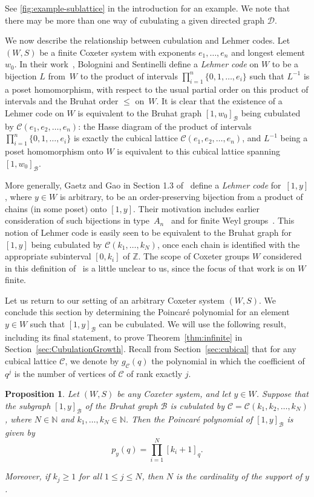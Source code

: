 \documentclass[11pt]{amsart}
\theoremstyle{plain}
\newtheorem{prop}[thm]{Proposition}
\theoremstyle{definition}
\newcommand{\cC}{\mathcal{C}}
\newcommand{\cD}{\mathcal{D}}
\newcommand{\Z}{\mathbb{Z}}
\newcommand{\N}{\mathbb{N}}
\newcommand{\cB}{\mathcal B}
\numberwithin{equation}{subsection}
\begin{document}
See \cref{fig:example-sublattice} in the introduction for an example. We note that there may be more than one way of cubulating a given directed graph $\cD$. 

We now describe the relationship between cubulation and Lehmer codes. Let $(W,S)$ be a finite Coxeter system with exponents $e_1, \dots, e_n$ and longest element $w_0$.  
In their work~\cite{Bolognini2025}, Bolognini and Sentinelli define a \emph{Lehmer code} on $W$ to be a bijection $L$ from~$W$ to the product of intervals $\prod_{i=1}^n \{ 0, 1, \dots, e_i \}$ such that $L^{-1}$ is a poset homomorphism, with respect to the usual partial order on this product of intervals and the Bruhat order $\leq$ on~$W$.
It is clear that the existence of a Lehmer code on $W$ is equivalent to the Bruhat graph $[1,w_0]_\cB$ being cubulated by $\cC(e_1,e_2,\ldots,e_n)$: the Hasse diagram of the product of intervals $\prod_{i=1}^n \{ 0, 1, \dots, e_i \}$ is exactly the cubical lattice $\cC(e_1,e_2,\ldots,e_n)$, and $L^{-1}$ being a poset homomorphism onto $W$  is equivalent to this cubical lattice spanning $[1,w_0]_\cB$. 

More generally, Gaetz and Gao in Section 1.3 of~\cite{GaetzGao} define a \emph{Lehmer code} for~$[1,y]$, where $y \in W$ is arbitrary, to be an order-preserving bijection from a product of chains (in some poset) onto $[1,y]$. Their  motivation includes earlier consideration of such bijections in type~$A_n$~\cite{Gasharov} and for finite Weyl groups~\cite{BilleyFanLosonczy,Billey}. This notion of Lehmer code is easily seen to be equivalent to the Bruhat graph for $[1,y]$ being cubulated by $\cC(k_1,\dots,k_N)$, once each chain is identified with the appropriate subinterval $[0,k_i]$ of $\Z$. The scope of Coxeter groups $W$ considered in this definition of~\cite{GaetzGao} is a little unclear to us, since the focus of that work is on $W$ finite.

Let us return to our setting of an arbitrary Coxeter system $(W,S)$. We conclude this section by determining the Poincar\'e polynomial for an element $y \in W$ such that $[1,y]_\cB$ can be cubulated.  We will use the following result, including its final statement, to prove Theorem~\ref{thm:infinite} in Section~\ref{sec:CubulationGrowth}. Recall from Section~\ref{sec:cubical} that for any cubical lattice $\cC$, we denote by $g_\cC(q)$ the polynomial in which the coefficient of $q^j$ is the number of vertices of $\cC$ of rank exactly $j$.

\begin{prop}\label{prop:cubical-implies-quantum} 
Let $(W,S)$ be any Coxeter system, and let $y \in W$. 
	Suppose that the subgraph $[1,y]_\cB$ of the Bruhat graph $\cB$ is cubulated by $\cC = \cC(k_1,k_2,\ldots, k_N)$, where $N \in \N$ and  $k_1,\dots,k_N \in \N$.
	Then the Poincar\'e polynomial of $[1,y]_\cB$ is given by   $$
    p_y(q)=\prod_{i=1}^N [k_i + 1]_q.		
  $$

	Moreover, if $k_j \geq 1$ for all $1 \leq j \leq N$, then $N$ is the cardinality of the support of $y$.
\end{prop}
\end{document}
